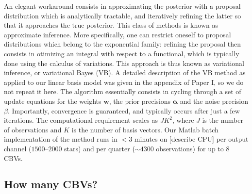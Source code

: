 \documentclass[useAMS,usenatbib]{mn2e}
\begin{document}
An elegant workaround consists in approximating the posterior with a
proposal distribution which is analytically tractable, and iteratively
refining the latter so that it approaches the true posterior. This
class of methods is known as approximate inference. More specifically,
one can restrict oneself to proposal distributions which belong to the
exponential family: refining the proposal then consists in otimizing
an integral with respect to a functional, which is typically done
using the calculus of variations. This approach is thus known as
variational inference, or variational Bayes (VB). A detailed
description of the VB method as applied to our linear basis model was
given in the appendix of Paper I, so we do not repeat it here. The
algorithm essentially consists in cycling through a set of update
equations for the weights $\mathbf{w}$, the prior precisions
$\boldsymbol{\alpha}$ and the noise precision $\beta$. Importantly,
convergence is guaranteed, and typically occurs after just a few
iterations. The computational requirement scales as $JK^2$, where $J$
is the number of observations and $K$ is the number of basis
vectors. Our {\sc Matlab} batch implementation of the method runs in
$< 3$ minutes on [describe CPU] per output channel ($1500$--$2000$
stars) and per quarter ($\sim 4300$ observations) for up to 8 CBVs. 

\subsection{How many CBVs?}
\end{document}
